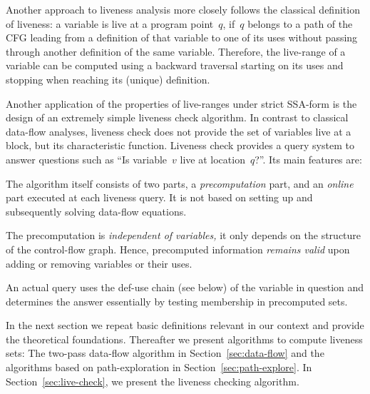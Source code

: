 Another approach to liveness analysis more closely follows the classical definition of liveness:
a variable is live at a program point~$q$, if~$q$ belongs to a path of the CFG leading from a definition of that variable to one of its uses without passing through another definition of the same variable.
Therefore, the live-range of a variable can be computed using a backward traversal starting on its uses and stopping when reaching its (unique) definition.

Another application of the properties of live-ranges under strict SSA-form is the design of an extremely simple liveness check algorithm.
In contrast to classical data-flow analyses, liveness check does not provide the set of variables live at a block, but its characteristic function.
Liveness check provides a query system to answer questions such as ``Is variable~$v$ live at location~$q$?''.
Its main features are:
\begin{compactenum}
\item
	The algorithm itself consists of two parts, a \emph{precomputation} part, and an \emph{online} part executed at each liveness query.
	It is not based on setting up and subsequently solving data-flow equations.
\item
	The precomputation is \emph{independent of variables,} it only depends on the structure of the control-flow graph.
	Hence, precomputed information \emph{remains valid} upon adding or removing variables or their uses.
\item
	An actual query uses the def-use chain (see below) of the variable in question and determines the answer essentially by testing membership in precomputed sets.
\end{compactenum}

In the next section we repeat basic definitions relevant in our context and provide the theoretical foundations.
Thereafter we present algorithms to compute liveness sets:
The two-pass data-flow algorithm in Section~\ref{sec:data-flow} and the algorithms based on path-exploration in Section~\ref{sec:path-explore}.
In Section~\ref{sec:live-check}, we present the liveness checking algorithm.


